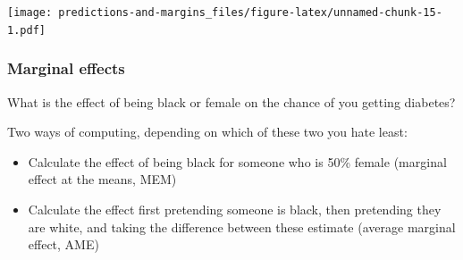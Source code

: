 \documentclass[]{article}
\newenvironment{Shaded}{\begin{snugshade}}{\end{snugshade}}
\newcommand{\CommentTok}[1]{\textcolor[rgb]{0.56,0.35,0.01}{\textit{#1}}}
\newcommand{\DecValTok}[1]{\textcolor[rgb]{0.00,0.00,0.81}{#1}}
\newcommand{\ErrorTok}[1]{\textcolor[rgb]{0.64,0.00,0.00}{\textbf{#1}}}
\newcommand{\FloatTok}[1]{\textcolor[rgb]{0.00,0.00,0.81}{#1}}
\newcommand{\KeywordTok}[1]{\textcolor[rgb]{0.13,0.29,0.53}{\textbf{#1}}}
\newcommand{\NormalTok}[1]{#1}
\newcommand{\OperatorTok}[1]{\textcolor[rgb]{0.81,0.36,0.00}{\textbf{#1}}}
\newcommand{\StringTok}[1]{\textcolor[rgb]{0.31,0.60,0.02}{#1}}
\begin{document}
\texttt{[image: predictions-and-margins\_files/figure-latex/unnamed-chunk-15-1.pdf]}

\begin{Shaded}
\end{Shaded}

\hypertarget{marginal-effects}{%
\subsubsection*{Marginal effects}\label{marginal-effects}}

What is the effect of being black or female on the chance of you getting
diabetes?

Two ways of computing, depending on which of these two you hate least:

\begin{itemize}
\item
  Calculate the effect of being black for someone who is 50\% female (marginal
  effect at the means, MEM)
\item
  Calculate the effect first pretending someone is black, then pretending they
  are white, and taking the difference between these estimate (average
  marginal effect, AME)
\end{itemize}
\end{document}
